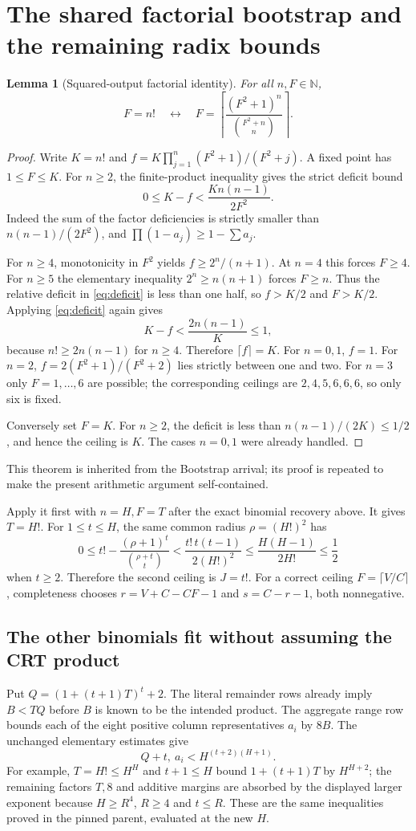 \documentclass[11pt]{article}
\newtheorem{lemma}[theorem]{Lemma}
\theoremstyle{definition}\newtheorem{definition}[theorem]{Definition}
\newcommand{\N}{\mathbb N}\newcommand{\Z}{\mathbb Z}\newcommand{\Q}{\mathbb Q}
\newcommand{\ceil}[1]{\left\lceil#1\right\rceil}
\begin{document}
\section{The shared factorial bootstrap and the remaining radix bounds}
\begin{lemma}[Squared-output factorial identity]\label{lem:factorial}
For all $n,F\in\N$,
\[
 F=n!\quad\longleftrightarrow\quad
 F=\ceil{\frac{(F^2+1)^n}{\binom{F^2+n}{n}}}.
\]
\end{lemma}
\begin{proof}
Write $K=n!$ and
$f=K\prod_{j=1}^n(F^2+1)/(F^2+j)$. A fixed point has $1\le F\le K$.
For $n\ge2$, the finite-product inequality gives the strict deficit bound
\begin{equation}\label{eq:deficit}
 0\le K-f<\frac{K n(n-1)}{2F^2}.
\end{equation}
Indeed the sum of the factor deficiencies is strictly smaller than
$n(n-1)/(2F^2)$, and $\prod(1-a_j)\ge1-\sum a_j$.

For $n\ge4$, monotonicity in $F^2$ yields $f\ge2^n/(n+1)$.
At $n=4$ this forces $F\ge4$. For $n\ge5$ the elementary inequality
$2^n\ge n(n+1)$ forces $F\ge n$. Thus the relative deficit in
\eqref{eq:deficit} is less than one half, so $f>K/2$ and $F>K/2$.
Applying \eqref{eq:deficit} again gives
\[
 K-f<\frac{2n(n-1)}K\le1,
\]
because $n!\ge2n(n-1)$ for $n\ge4$. Therefore $\lceil f\rceil=K$.
For $n=0,1$, $f=1$. For $n=2$, $f=2(F^2+1)/(F^2+2)$ lies strictly
between one and two. For $n=3$ only $F=1,\ldots,6$ are possible; the
corresponding ceilings are $2,4,5,6,6,6$, so only six is fixed.

Conversely set $F=K$. For $n\ge2$, the deficit is less than
$n(n-1)/(2K)\le1/2$, and hence the ceiling is $K$. The cases $n=0,1$
were already handled.
\end{proof}
This theorem is inherited from the Bootstrap arrival; its proof is
repeated to make the present arithmetic argument self-contained.

Apply it first with $n=H,F=T$ after the exact binomial recovery above.
It gives $T=H!$. For $1\le t\le H$, the same common radius $\rho=(H!)^2$
has
\[
 0\le t!-\frac{(\rho+1)^t}{\binom{\rho+t}{t}}
 <\frac{t!\,t(t-1)}{2(H!)^2}
 \le\frac{H(H-1)}{2H!}\le\frac12
\]
when $t\ge2$. Therefore the second ceiling is $J=t!$.
For a correct ceiling $F=\lceil V/C\rceil$, completeness chooses
$r=V+C-CF-1$ and $s=C-r-1$, both nonnegative.

\subsection{The other binomials fit without assuming the CRT product}
Put $Q=(1+(t+1)T)^t+2$. The literal remainder rows already imply
$B<TQ$ before $B$ is known to be the intended product. The aggregate
range row bounds each of the eight positive column representatives
$a_i$ by $8B$. The unchanged elementary estimates give
\[
 Q+t,\ a_i<H^{(t+2)(H+1)}.
\]
For example, $T=H!\le H^H$ and $t+1\le H$ bound
$1+(t+1)T$ by $H^{H+2}$; the remaining factors $T,8$ and additive
margins are absorbed by the displayed larger exponent because
$H\ge R^4$, $R\ge4$ and $t\le R$. These are the same inequalities
proved in the pinned parent, evaluated at the new $H$.
\end{document}
